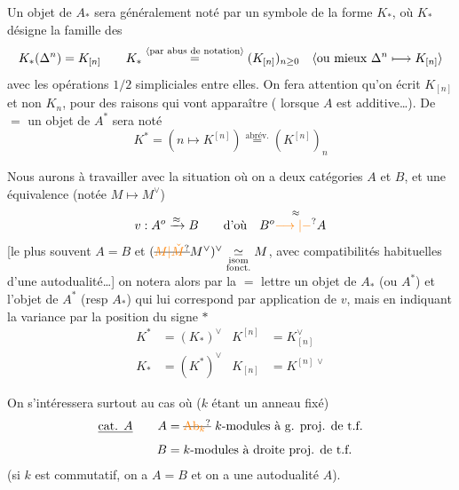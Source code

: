 Un objet de $A_*$ sera généralement noté par un symbole de la forme $K_*$, où $K_*$ désigne la famille des
\[
 K_*(\Delta^n)=K_{[n]}\qquad
 K_*\overset{\inserted{\text{par abus de notation}}}{=}(K_{[n]})_{n\geq0}
 \quad\inserted{\text{ou mieux }\Delta^n\longmapsto K_{[n]}}
\]
avec les opérations $1/2$ simpliciales entre elles. On fera attention qu'on écrit $K_{[n]}$ et non $K_n$, pour des raisons qui vont apparaître ( lorsque $A$ est additive\ldots). De $=$ un objet de $A^*$ sera noté
\[
 K^*=(n\longmapsto K^{[n]})\overset{\text{abrév.}}{=}(K^{[n]})_n
\]

Nous aurons à travailler avec la situation où on a deux catégories $A$ et $B$, et une équivalence (notée \deleted{$\unsure{*}$} $M\longmapsto M^\vee$)
\[
 v:A^o\xrightarrow{\approx}B\qquad\text{d'où}\quad B^o\overset{\approx}{\unsure{\longrightarrow|-}}A
\]
[le plus souvent $A=B$ et $(\deleted{\unsure{M|\check{M}}}M^\vee)^\vee\underset{\substack{\text{isom}\\\text{fonct.}}}{\simeq}M$, avec compatibilités habituelles d'une autodualité\ldots]
on notera alors  par la $=$ lettre un objet de $A_*$ (ou $A^*$) et l'objet de $A^*$ (resp $A_*$) qui lui correspond par application de $v$, mais en indiquant la variance par la position du signe $*$
\[
 \begin{aligned}
 K^*&=(K_*)^\vee & K^{[n]}&=K_{[n]}^\vee\\
 K_*&=(K^*)^\vee & K_{[n]}&=K^{[n]\,\vee}
 \end{aligned}
\]

On s'intéressera surtout au cas où ($k$ étant un anneau fixé) 
\[
 \begin{aligned}
 \deleted{\text{cat. }A}\qquad A&=\deleted{\unsure{\mathrm{Ab}_k}}\ k\text{-modules à g. proj. de t.f.}\\
 B&=k\text{-modules à droite proj. de t.f.}
 \end{aligned}
\]
(si $k$ est commutatif, on a $A=B$ et on a une autodualité  $A$).

